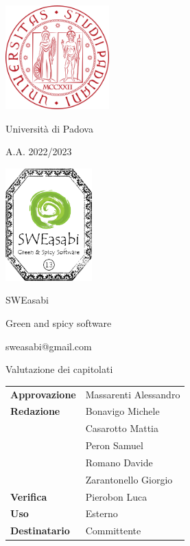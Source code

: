\documentclass{article}
\begin{document}
\begin{center}
    
    \includegraphics[width=0.3\textwidth]{immagini/logo_unipd.png}

    Università di Padova
    
    A.A. 2022/2023
    
    \vspace{2cm}

    \includegraphics[width=0.25\textwidth]{immagini/logo_13.png}
    
    \Large SWEasabi

    \tiny Green and spicy software

    \small sweasabi@gmail.com
        
    \vspace{2cm}

    \Huge Valutazione dei capitolati
        
    \vspace{2cm}
    
    \normalsize
    \begin{center}
        \begin{tabularx}{7cm}{l | X}            
            \textbf{Approvazione} & Massarenti Alessandro\\
            \textbf{Redazione} & Bonavigo Michele \\
            & Casarotto Mattia\\
            & Peron Samuel\\
            & Romano Davide\\
            & Zarantonello Giorgio\\
            \textbf{Verifica} & Pierobon Luca\\
            \hline
            \textbf{Uso} & Esterno\\
            \textbf{Destinatario} & Committente\\
        \end{tabularx}
    \end{center}
        
\end{center}
\end{document}
